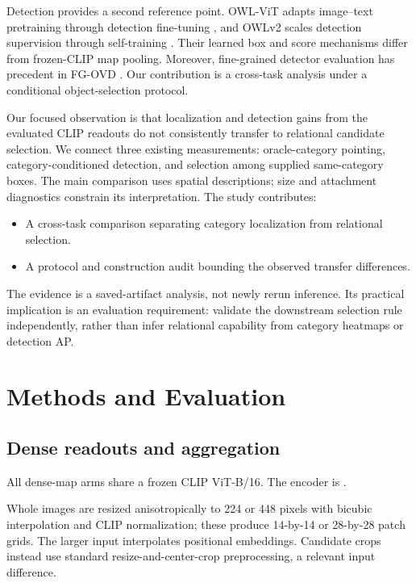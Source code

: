 \documentclass[10pt,twocolumn,letterpaper]{article}
\providecommand{\tightlist}{\setlength{\itemsep}{0pt}\setlength{\parskip}{0pt}}
\begin{document}
Detection provides a second reference point. OWL-ViT adapts image--text
pretraining through detection fine-tuning \citep{minderer2022owlvit},
and OWLv2 scales detection supervision through self-training
\citep{minderer2023owlv2}. Their learned box and score mechanisms differ
from frozen-CLIP map pooling. Moreover, fine-grained detector evaluation
has precedent in FG-OVD \citep{bianchi2023fgovd}. Our contribution is a
cross-task analysis under a conditional object-selection protocol.

Our focused observation is that localization and detection gains from
the evaluated CLIP readouts do not consistently transfer to relational
candidate selection. We connect three existing measurements:
oracle-category pointing, category-conditioned detection, and selection
among supplied same-category boxes. The main comparison uses spatial
descriptions; size and attachment diagnostics constrain its
interpretation. The study contributes:

\begin{itemize}
\tightlist
\item
  A cross-task comparison separating category localization from
  relational selection.
\item
  A protocol and construction audit bounding the observed transfer
  differences.
\end{itemize}

The evidence is a saved-artifact analysis, not newly rerun inference.
Its practical implication is an evaluation requirement: validate the
downstream selection rule independently, rather than infer relational
capability from category heatmaps or detection AP.

\section{Methods and Evaluation}\label{methods-and-evaluation}

\subsection{Dense readouts and
aggregation}\label{dense-readouts-and-aggregation}

All dense-map arms share a frozen CLIP ViT-B/16. The encoder is
.

Whole images are resized anisotropically to 224 or 448 pixels with
bicubic interpolation and CLIP normalization; these produce 14-by-14 or
28-by-28 patch grids. The larger input interpolates positional
embeddings. Candidate crops instead use standard resize-and-center-crop
preprocessing, a relevant input difference.
\end{document}

